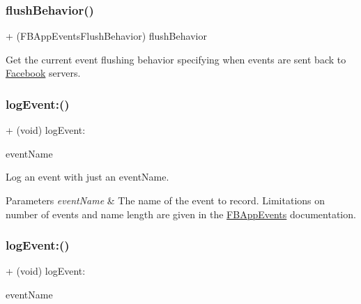 \subsubsection{\texorpdfstring{flush\+Behavior()}{flushBehavior()}\hspace{0.1cm}{\footnotesize\ttfamily [5/5]}}
{\footnotesize\ttfamily + (F\+B\+App\+Events\+Flush\+Behavior) flush\+Behavior \begin{DoxyParamCaption}{ }\end{DoxyParamCaption}}

Get the current event flushing behavior specifying when events are sent back to \hyperlink{interfaceFacebook}{Facebook} servers. \mbox{\label{interfaceFBAppEvents_a816373dd50bcf7381bf8194758ef8441}} 
\subsubsection{\texorpdfstring{log\+Event\+:()}{logEvent:()}\hspace{0.1cm}{\footnotesize\ttfamily [1/5]}}
{\footnotesize\ttfamily + (void) log\+Event\+: \begin{DoxyParamCaption}\item[{(N\+S\+String $\ast$)}]{event\+Name }\end{DoxyParamCaption}}

Log an event with just an event\+Name.


\begin{DoxyParams}{Parameters}
{\em event\+Name} & The name of the event to record. Limitations on number of events and name length are given in the {\ttfamily \hyperlink{interfaceFBAppEvents}{F\+B\+App\+Events}} documentation. \\
\hline
\end{DoxyParams}
\mbox{\label{interfaceFBAppEvents_a816373dd50bcf7381bf8194758ef8441}} 
\subsubsection{\texorpdfstring{log\+Event\+:()}{logEvent:()}\hspace{0.1cm}{\footnotesize\ttfamily [2/5]}}
{\footnotesize\ttfamily + (void) log\+Event\+: \begin{DoxyParamCaption}\item[{(N\+S\+String $\ast$)}]{event\+Name }\end{DoxyParamCaption}}

